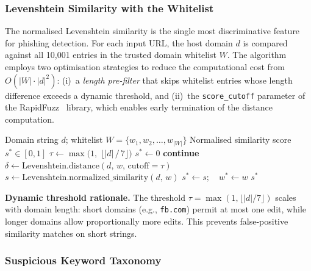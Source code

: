 \documentclass[a4paper,12pt]{article}
\begin{document}
\subsubsection{Levenshtein Similarity with the Whitelist}
\label{sec:levenshtein}

The normalised Levenshtein similarity is the single most discriminative feature for phishing detection. For each input URL, the host domain $d$ is compared against all 10,001 entries in the trusted domain whitelist $W$. The algorithm employs two optimisation strategies to reduce the computational cost from $O(|W| \cdot |d|^2)$: (i)~a \textit{length pre-filter} that skips whitelist entries whose length difference exceeds a dynamic threshold, and (ii)~the \texttt{score\_cutoff} parameter of the RapidFuzz~\cite{rapidfuzz} library, which enables early termination of the distance computation.

\begin{algorithm}[H]
\caption{Optimised Levenshtein similarity against the whitelist.}
\label{alg:levenshtein}
\begin{algorithmic}[1]
\Require Domain string $d$; whitelist $W = \{w_1, w_2, \ldots, w_{|W|}\}$
\Ensure Normalised similarity score $s^* \in [0, 1]$
\State $\tau \gets \max\!\bigl(1,\; \lfloor |d|\,/\,7 \rfloor\bigr)$ 
\State $s^* \gets 0$
     \textbf{continue} 
    \EndIf
    \State $\delta \gets \mathrm{Levenshtein.distance}(d,\, w,\, \mathrm{cutoff}{=}\tau)$
    \If{$\delta \leq \tau$}
        \State $s \gets \mathrm{Levenshtein.normalized\_similarity}(d,\, w)$
            \State $s^* \gets s;\quad w^* \gets w$
        \EndIf
    \EndIf
\EndFor
\State \Return $s^*$
\end{algorithmic}
\end{algorithm}

\textbf{Dynamic threshold rationale.} The threshold $\tau = \max(1, \lfloor |d|/7 \rfloor)$ scales with domain length: short domains (e.g., \texttt{fb.com}) permit at most one edit, while longer domains allow proportionally more edits. This prevents false-positive similarity matches on short strings.

\subsubsection{Suspicious Keyword Taxonomy}
\end{document}
